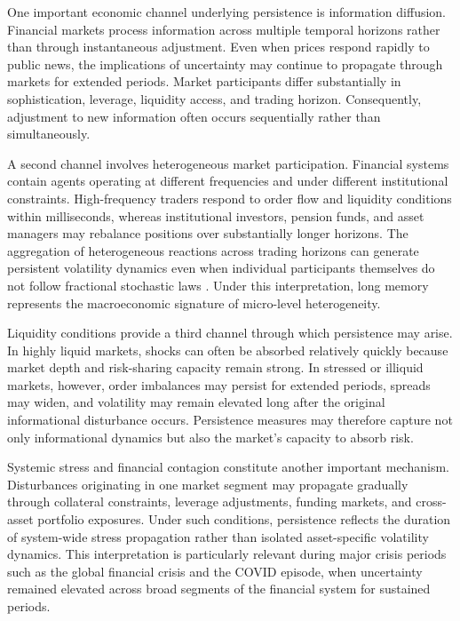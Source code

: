 \documentclass[unnumsec,webpdf,contemporary,large]{oup-authoring-template}%
\theoremstyle{thmstyleone}%
\theoremstyle{thmstyletwo}%
\theoremstyle{thmstylethree}%
\begin{document}
One important economic channel underlying persistence is information
diffusion. Financial markets process information across multiple temporal
horizons rather than through instantaneous adjustment. Even when prices
respond rapidly to public news, the implications of uncertainty may continue
to propagate through markets for extended periods. Market participants
differ substantially in sophistication, leverage, liquidity access, and
trading horizon. Consequently, adjustment to new information often occurs
sequentially rather than simultaneously.

A second channel involves heterogeneous market participation. Financial
systems contain agents operating at different frequencies and under
different institutional constraints. High-frequency traders respond to
order flow and liquidity conditions within milliseconds, whereas
institutional investors, pension funds, and asset managers may rebalance
positions over substantially longer horizons. The aggregation of
heterogeneous reactions across trading horizons can generate persistent
volatility dynamics even when individual participants themselves do not
follow fractional stochastic laws
\citep{muller1997volatilities,corsi2009simple}. Under this interpretation,
long memory represents the macroeconomic signature of micro-level
heterogeneity.

Liquidity conditions provide a third channel through which persistence may
arise. In highly liquid markets, shocks can often be absorbed relatively
quickly because market depth and risk-sharing capacity remain strong. In
stressed or illiquid markets, however, order imbalances may persist for
extended periods, spreads may widen, and volatility may remain elevated
long after the original informational disturbance occurs. Persistence
measures may therefore capture not only informational dynamics but also the
market's capacity to absorb risk.

Systemic stress and financial contagion constitute another important
mechanism. Disturbances originating in one market segment may propagate
gradually through collateral constraints, leverage adjustments, funding
markets, and cross-asset portfolio exposures. Under such conditions,
persistence reflects the duration of system-wide stress propagation rather
than isolated asset-specific volatility dynamics. This interpretation is
particularly relevant during major crisis periods such as the global
financial crisis and the COVID episode, when uncertainty remained elevated
across broad segments of the financial system for sustained periods.
\end{document}
